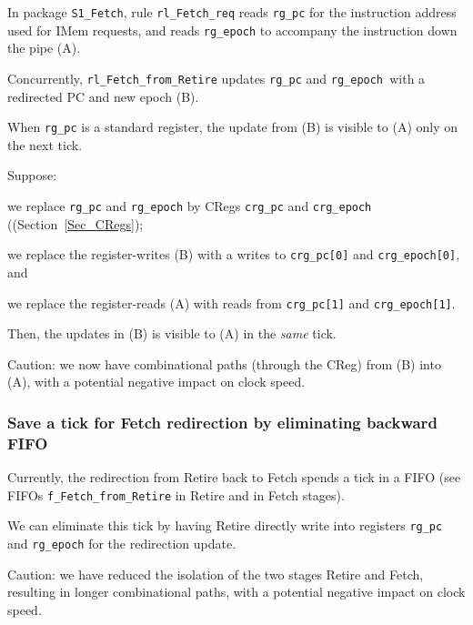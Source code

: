In package \verb|S1_Fetch|, rule \verb|rl_Fetch_req| reads
\verb|rg_pc| for the instruction address used for IMem requests, and
reads \verb|rg_epoch| to accompany the instruction down the pipe (A).

Concurrently, \verb|rl_Fetch_from_Retire| updates \verb|rg_pc| and
\verb|rg_epoch |with a redirected PC and new epoch (B).

When \verb|rg_pc| is a standard register, the update from (B) is
visible to (A) only on the next tick.

Suppose:
\begin{tightlist}

 \item we replace \verb|rg_pc| and \verb|rg_epoch| by CRegs \verb|crg_pc|
       and \verb|crg_epoch| ((Section~\ref{Sec_CRegs});

 \item we replace the register-writes (B) with a writes to \verb|crg_pc[0]|
       and \verb|crg_epoch[0]|, and

 \item we replace the register-reads (A) with reads from
       \verb|crg_pc[1]| and \verb|crg_epoch[1]|.

\end{tightlist}
Then, the updates in (B) is visible to (A) in the \emph{same} tick.

Caution: we now have combinational paths (through the CReg) from
(B) into (A), with a potential negative impact on clock speed.


\subsubsection{Save a tick for Fetch redirection by eliminating backward FIFO}

Currently, the redirection from Retire back to Fetch spends a tick in
a FIFO (see FIFOs \verb|f_Fetch_from_Retire| in Retire and in Fetch
stages).

We can eliminate this tick by having Retire directly write into
registers \verb|rg_pc| and \verb|rg_epoch| for the redirection update.

Caution: we have reduced the isolation of the two stages Retire and
Fetch, resulting in longer combinational paths, with a potential
negative impact on clock speed.


